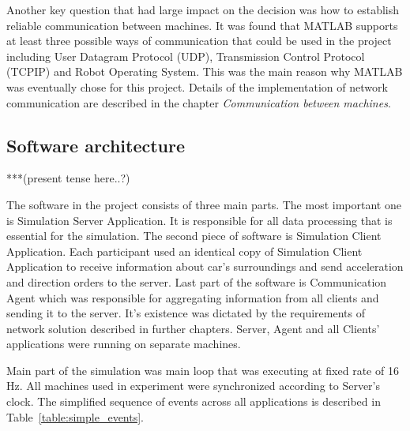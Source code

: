 \documentclass[11pt,english]{article}
\begin{document}
Another key question that had large impact on the decision was how to establish reliable communication between machines. It was found that MATLAB supports at least three possible ways of communication that could be used in the project including User Datagram Protocol (UDP), Transmission Control Protocol (TCPIP) and Robot Operating System. This was the main reason why MATLAB was eventually chose for this project.
Details of the implementation of network communication are described in the chapter \textit{Communication between machines}.

\subsection{Software architecture}
***(present tense here..?)

The software in the project consists of three  main parts. The most important one is Simulation Server Application. It is responsible for all data processing that is essential for the simulation. The second piece of software is Simulation Client Application. Each participant used an identical copy of Simulation Client Application to receive information about car's surroundings and send acceleration and direction orders to the server. Last part of the software is Communication Agent which was responsible for aggregating information from all clients and sending it to the server. It's existence was dictated by the requirements of network solution described in further chapters. Server, Agent and all Clients' applications were running on separate machines.

Main part of the simulation was main loop that was executing at fixed rate of 16 Hz. All machines used in experiment were synchronized according to Server's clock. The simplified sequence of events across all applications is described in Table~\ref{table:simple_events}.


\end{document}
